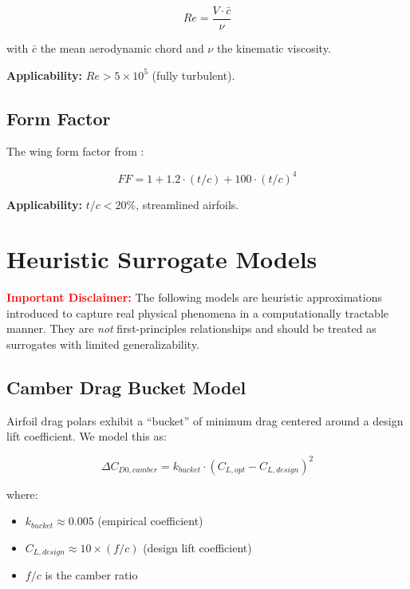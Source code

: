 \documentclass[11pt,a4paper]{article}
\begin{document}
\begin{equation}
Re = \frac{V \cdot \bar{c}}{\nu}
\end{equation}

with $\bar{c}$ the mean aerodynamic chord and $\nu$ the kinematic viscosity.

\textbf{Applicability:} $Re > 5 \times 10^5$ (fully turbulent).

\subsection{Form Factor}

The wing form factor from \citet{hoerner1965}:

\begin{equation}
FF = 1 + 1.2 \cdot (t/c) + 100 \cdot (t/c)^4
\label{eq:form_factor}
\end{equation}

\textbf{Applicability:} $t/c < 20\%$, streamlined airfoils.

\section{Heuristic Surrogate Models}

\textcolor{red}{\textbf{Important Disclaimer:}} The following models are heuristic approximations introduced to capture real physical phenomena in a computationally tractable manner. They are \textit{not} first-principles relationships and should be treated as surrogates with limited generalizability.

\subsection{Camber Drag Bucket Model}

Airfoil drag polars exhibit a ``bucket'' of minimum drag centered around a design lift coefficient. We model this as:

\begin{equation}
\Delta C_{D0,camber} = k_{bucket} \cdot (C_{L,opt} - C_{L,design})^2
\label{eq:camber_penalty}
\end{equation}

where:
\begin{itemize}
    \item $k_{bucket} \approx 0.005$ (empirical coefficient)
    \item $C_{L,design} \approx 10 \times (f/c)$ (design lift coefficient)
    \item $f/c$ is the camber ratio
\end{itemize}
\end{document}
